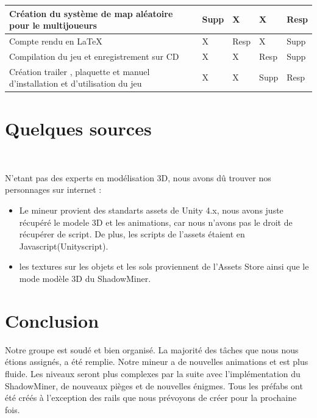 \documentclass[titlepage, 13px, a4paper]{report}
\begin{document}
{\begin{tabular}{|p{6cm}|p{1.2cm}|p{1.2cm}|p{1.2cm}|p{1.2cm}|}
		\hline
		Création du système de map aléatoire pour le multijoueurs & Supp\footnotemark[2] & X & X & Resp\footnotemark[1] \\
		\hline
		Compte rendu en \LaTeX & X & Resp\footnotemark[1] & X & Supp\footnotemark[2]  \\
		\hline
		Compilation du jeu et enregistrement sur CD & X & X & Resp\footnotemark[1] & Supp\footnotemark[2] \\
		\hline
		Création trailer , plaquette et manuel d'installation et d'utilisation du jeu & X & X & Supp\footnotemark[2] & Resp\footnotemark[1] \\
		\hline
	\end{tabular}
	\label{repartition}		
}





\newpage
{}
\part{Quelques sources}
\paragraph{} \hspace{0pt} \\ 
N'etant pas des experts en modélisation 3D, nous avons dû trouver nos personnages sur internet : 
{\begin{itemize}
	\item Le mineur provient des standarts assets de Unity 4.x, nous avons juste récupéré le modele 3D et les animations, 
	car nous n'avons pas le droit de récupérer de script. De plus, les scripts de l'assets étaient en Javascript(Unityscript).
	\item les textures sur les objets et les sols proviennent de l'Assets Store ainsi que le mode modèle 3D du ShadowMiner.
\end{itemize}}






\newpage
{}
\part{Conclusion}
Notre groupe est soudé et bien organisé. La majorité des tâches que nous nous étions assignés, a été remplie. 
Notre mineur a de nouvelles animations et est plus fluide. Les niveaux seront plus complexes par la suite avec l’implémentation du ShadowMiner, 
de nouveaux pièges et de nouvelles énigmes. Tous les préfabs ont été créés à l’exception des rails que nous prévoyons de créer pour la prochaine fois.  \\ \\
\end{document}
